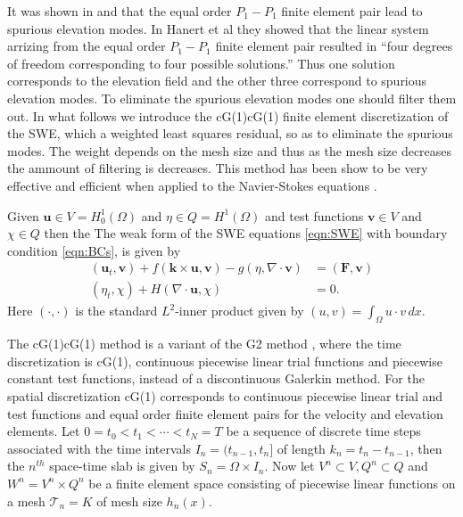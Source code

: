 It was shown in \cite{Hanert2002} and \cite{Le-Roux1998} that the equal order
$P_1-P_1$ finite element pair lead to spurious elevation modes. In Hanert et al
\cite{Hanert2002} they showed that the linear system arrizing from the equal
order $P_1-P_1$ finite element pair resulted in ``four degrees of freedom
corresponding to four possible solutions.'' Thus one solution corresponds to the
elevation field and the other three correspond to spurious elevation modes. To
eliminate the spurious elevation modes one should filter them out. In what
follows we introduce the cG(1)cG(1) finite element discretization of the SWE,
which a weighted least squares residual, so as to eliminate the spurious modes.
The weight depends on the mesh size and thus as the mesh size decreases the
ammount of filtering is decreases. This method has been show to be very
effective and efficient when applied to the Navier-Stokes equations
\cite{Hoffman2003,Hoffman2006a,Hoffman2006b,Hoffman2011,Jansson2011}.

Given $\mathbf{u} \in V=H^1_0(\Omega)$ and $\eta \in Q=H^1(\Omega)$ and
test functions $\mathbf{v} \in V$ and $\chi \in Q$ then the The weak form of the
SWE equations \eqref{eqn:SWE} with boundary condition \eqref{eqn:BCs}, is given
by
\begin{equation}
  \begin{split}
    (\mathbf{u}_t, \mathbf{v}) + f(\mathbf{k} \times
        \mathbf{u}, \mathbf{v}) - g (\eta, \nabla\cdot \mathbf{v}) 
        &= (\mathbf{F},\mathbf{v})\\
    (\eta_t, \chi) + H (\nabla\cdot \mathbf{u},\chi) &= 0.
  \end{split}
  \label{eqn:WeakSWE}
\end{equation}
Here $(\cdot, \cdot)$ is the standard $L^2$-inner product given by $(u,v) =
\int_{\Omega}\! u\cdot v\, dx$.

The cG(1)cG(1) method is a variant of the G2 method \cite{Johnson1998}, where
the time discretization is cG(1), continuous piecewise linear trial functions
and piecewise constant test functions, instead of a discontinuous Galerkin
method. For the spatial discretization cG(1) corresponds to continuous piecewise
linear trial and test functions and equal order finite element pairs for the
velocity and elevation elements. Let $0 = t_0 < t_1 < \cdots < t_N = T$ be a
sequence of discrete time steps associated with the time intervals $I_n =
(t_{n-1},t_n]$ of length $k_n = t_n - t_{n-1}$, then the $n^{th}$
space-time slab is given by $S_n = \Omega \times I_n$. Now let $V^n \subset V,
Q^n \subset Q$ and $W^n = V^n \times Q^n$ be a finite element space consisting
of piecewise linear functions on a mesh $\mathcal{T}_n = {K}$ of mesh size
$h_n(x)$.

